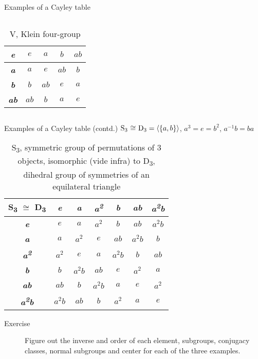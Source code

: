 \documentclass{beamer}
\begin{document}
\begin{frame}{Examples of a Cayley table}
\begin{columns}
\begin{table}[]
\begin{tabular}{|c|c|c|c|c|}
            \textbf{\textit{e}} & $e$ & $a$ & $b$ & $ab$ \\ \hline
            \textbf{\textit{a}} & $a$ & $e$ & $ab$ & $b$\\ \hline
            \textbf{\textit{b}} & $b$ & $ab$ & $e$ & $a$ \\ \hline
            \textbf{\textit{ab}} & $ab$ & $b$ & $a$ & $e$ \\\hline
        \end{tabular}
        \caption{V, Klein four-group}
    \end{table}
    \end{columns}
\end{frame}

\begin{frame}{Examples of a Cayley table (contd.)}
    \centering
    $\text{S\textsubscript{3} $\cong$ D\textsubscript{3}}=\langle\{a,b\}\rangle$, $a^3=e=b^2$, $a^{-1}b=ba$
    \begin{table}[]
        \centering
        \setlength\extrarowheight{3pt}
        \begin{tabular}{|c|c|c|c|c|c|c|}
            \hline\textbf{S\textsubscript{3} $\cong$ D\textsubscript{3}} & \textbf{\textit{e}} & \textbf{\textit{a}} & \textbf{\textit{a\textsuperscript{2}}} & \textbf{\textit{b}} & \textbf{\textit{ab}} & \textbf{\textit{a\textsuperscript{2}b}} \\ \hline
            \textbf{\textit{e}} & $e$ & $a$ & $a^2$ & $b$ & $ab$ & $a^2b$ \\ \hline
            \textbf{\textit{a}} & $a$ & $a^2$ & $e$ & $ab$ & $a^2b$ & $b$\\ \hline
            \textbf{\textit{a\textsuperscript{2}}} & $a^2$ & $e$ & $a$ & $a^2b$ & $b$ & $ab$ \\ \hline
            \textbf{\textit{b}} & $b$ & $a^2b$ & $ab$ & $e$ & $a^2$ & $a$ \\\hline
            \textbf{\textit{ab}} & $ab$ & $b$ & $a^2b$ & $a$ & $e$ & $a^2$ \\\hline
            \textbf{\textit{a\textsuperscript{2}b}} & $a^2b$ & $ab$ & $b$ & $a^2$ & $a$ & $e$ \\\hline
        \end{tabular}
        \caption{S\textsubscript{3}, symmetric group of permutations of 3 objects, isomorphic (vide infra) to \centering D\textsubscript{3}, dihedral group of symmetries of an equilateral triangle}
    \end{table}
    \begin{description}
        \item[Exercise] Figure out the inverse and order of each element, subgroups, conjugacy classes, normal subgroups and center for each of the three examples.
    \end{description}
\end{frame}
\end{document}
